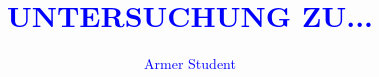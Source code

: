 \documentclass[]{MRTthesis}
\title{\textcolor{blue}{\MakeUppercase{Untersuchung zu...}}}
\author{\textcolor{blue}{Armer Student}}
\begin{document}
\maketitle
\affidavit


\tableofcontents
\listoffigures
\listoftables

\mainpart%





\appendix
\clearpage
\raggedbottom

\end{document}
